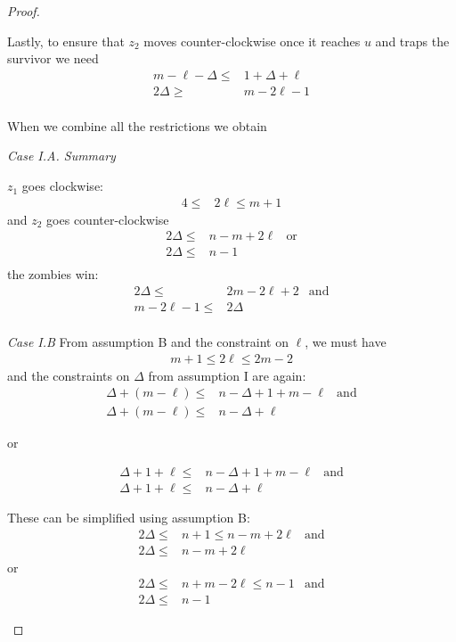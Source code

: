 \begin{proof}
\begin{proofpart}
  Lastly, to ensure that $z_2$ moves counter-clockwise once
  it reaches $u$ and traps the survivor we need
  \begin{align*}
   m - \ell - \Delta \leq & 1 + \Delta + \ell \\
   2 \Delta \geq          & m - 2\ell  -1     \\
  \end{align*}

  When we combine all the restrictions we obtain

  \textit{Case I.A. Summary}

  $z_1$ goes clockwise:
  \begin{align*}
   4 \leq & 2 \ell \leq m + 1
  \end{align*}
  and $z_2$ goes counter-clockwise
  \begin{align*}
   2 \Delta \leq & n - m + 2\ell & \text{or} \\
   2 \Delta \leq & n - 1                     \\
  \end{align*}
  the zombies win:
  \begin{align*}
   2 \Delta \leq      & 2 m- 2 \ell + 2 & \text{and} \\
   m - 2\ell  -1 \leq & 2 \Delta                     \\
  \end{align*}

  \textit{Case I.B}
  From assumption B and the constraint on $\ell$, we must have
  \begin{align*}
   m + 1 \leq 2 \ell \leq 2m - 2
  \end{align*}
  and the constraints on $\Delta$ from assumption I are again:
  \begin{align*}
   \Delta + (m - \ell) \leq & n - \Delta + 1 + m - \ell & \text{and} \\
   \Delta + (m - \ell) \leq & n - \Delta + \ell
  \end{align*}
  \begin{center}or\end{center}
  \begin{align*}
   \Delta + 1 + \ell \leq & n - \Delta + 1 + m - \ell & \text{and} \\
   \Delta + 1 + \ell \leq & n - \Delta + \ell
  \end{align*}

  These can be simplified using assumption B:
  \begin{align*}
   2 \Delta \leq & n+1 \leq n-m+2\ell & \text{and} \\
   2 \Delta \leq & n - m + 2\ell
  \end{align*}
  or
  \begin{align*}
   2 \Delta \leq & n+m -2 \ell \leq n-1 & \text{and} \\
   2 \Delta \leq & n -1
  \end{align*}


\end{proofpart}
\end{proof}
